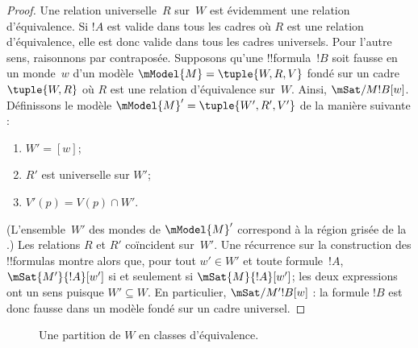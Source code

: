 \documentclass[../../../include/open-logic-section]{subfiles}
\begin{document}
\begin{proof}
  Une relation universelle~$R$ sur~$W$ est évidemment une relation
  d'équivalence. Si $!A$ est valide dans tous les cadres où $R$ est
  une relation d'équivalence, elle est donc valide dans tous les
  cadres universels. Pour l'autre sens, raisonnons par contraposée.
  Supposons qu'une !!{formula}~$!B$ soit fausse en un monde~$w$ d'un
  modèle $\mModel{M} = \tuple{W, R, V}$ fondé sur un cadre
  $\tuple{W,R}$ où $R$ est une relation d'équivalence sur~$W$.
  Ainsi, $\mSat/{M}{!B}[w]$. Définissons le modèle
  $\mModel{M}' = \tuple{W', R', V'}$ de la manière suivante :
  \begin{enumerate}
  \item $W' = [w]$;
  \item $R'$ est universelle sur $W'$;
  \item $V'(p) = V(p) \cap W'$. 
  \end{enumerate}
  (L'ensemble~$W'$ des mondes de $\mModel{M}'$ correspond à la région
  grisée de la .) Les relations $R$ et $R'$
  coïncident sur~$W'$. Une récurrence sur la construction des
  !!{formula}s montre alors que, pour tout $w' \in W'$ et toute
  formule~$!A$, $\mSat{M'}{!A}[w']$ si et seulement si
  $\mSat{M}{!A}[w']$; les deux expressions ont un sens puisque
  $W' \subseteq W$. En particulier, $\mSat/{M'}{!B}[w]$ : la formule
  $!B$ est donc fausse dans un modèle fondé sur un cadre universel.
\end{proof}

\begin{figure}[t]
  \centering
  \caption{Une partition de $W$ en classes d'équivalence.}
\end{figure}
\end{document}
